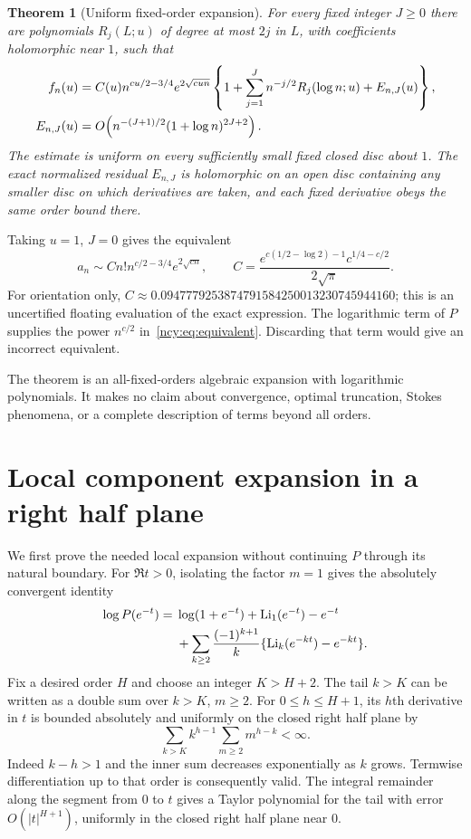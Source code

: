 \documentclass[11pt,letterpaper]{article}
\numberwithin{equation}{section}
\newtheorem{theorem}{Theorem}[section]
\theoremstyle{remark}\newtheorem{remark}[theorem]{Remark}
\newcommand{\Li}{\operatorname{Li}}
\theoremstyle{definition}\newtheorem{definition}[theorem]{Definition}\theoremstyle{plain}
\begin{document}
\begin{theorem}[Uniform fixed-order expansion]\label{ncy:thm:main}
For every fixed integer $J\geq0$ there are polynomials $R_j(L;u)$ of
degree at most $2j$ in $L$, with coefficients holomorphic near $1$, such
that
\begin{align}\label{ncy:eq:main}
 f_n(u)&=C(u)n^{cu/2-3/4}e^{2\sqrt{cun}}
 \left\{1+\sum_{j=1}^J n^{-j/2}R_j(\log n;u)
       +E_{n,J}(u)\right\},\\
 E_{n,J}(u)&=O\!\left(n^{-(J+1)/2}(1+\log n)^{2J+2}\right).
 \notag
\end{align}
The estimate is uniform on every sufficiently small fixed closed disc
about $1$. The exact normalized residual $E_{n,J}$ is holomorphic on
an open disc containing any smaller disc on which derivatives are
taken, and each fixed derivative obeys the same order bound there.
\end{theorem}

Taking $u=1$, $J=0$ gives the equivalent
\begin{equation}\label{ncy:eq:equivalent}
 a_n\sim C n!n^{c/2-3/4}e^{2\sqrt{cn}},\qquad
 C=\frac{e^{c(1/2-\log2)-1}c^{1/4-c/2}}{2\sqrt\pi}.
\end{equation}
For orientation only,
$C\approx0.0947779253874791584250013230745944160$; this is an
uncertified floating evaluation of the exact expression. The logarithmic
term of $P$ supplies the power $n^{c/2}$ in~\eqref{ncy:eq:equivalent}.
Discarding that term would give an incorrect equivalent.

The theorem is an all-fixed-orders algebraic expansion with logarithmic
polynomials. It makes no claim about convergence, optimal truncation,
Stokes phenomena, or a complete description of terms beyond all orders.

\section{Local component expansion in a right half plane}\label{ncy:sec:sector}
We first prove the needed local expansion without continuing $P$
through its natural boundary. For $\Re t>0$, isolating the factor $m=1$
gives the absolutely convergent identity
\begin{align}\label{ncy:eq:polylog}
 \log P(e^{-t})={}&\log(1+e^{-t})+\Li_1(e^{-t})-e^{-t}\\
 &+\sum_{k\geq2}\frac{(-1)^{k+1}}{k}
       \{\Li_k(e^{-kt})-e^{-kt}\}.\notag
\end{align}
Fix a desired order $H$ and choose an integer $K>H+2$. The tail $k>K$
can be written as a double sum over $k>K$, $m\geq2$. For
$0\leq h\leq H+1$, its $h$th derivative in $t$ is bounded absolutely
and uniformly on the closed right half plane by
\begin{equation}\label{ncy:eq:tail}
 \sum_{k>K}k^{h-1}\sum_{m\geq2}m^{h-k}<\infty.
\end{equation}
Indeed $k-h>1$ and the inner sum decreases exponentially as $k$ grows.
Termwise differentiation up to that order is consequently valid. The
integral remainder along the segment from $0$ to $t$ gives a Taylor
polynomial for the tail with error $O(|t|^{H+1})$, uniformly in the
closed right half plane near $0$.
\end{document}
